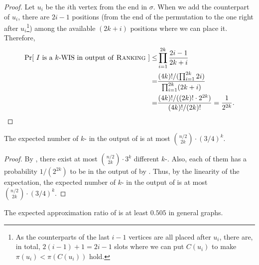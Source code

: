 \begin{proof}
Let $u_i$ be the $i$th vertex from the end in $\sigma$. When we add the counterpart of $u_i$, there are $2i - 1$ positions (from the end of the permutation to the one right after $u_i$\footnote{As the counterparts of the last $i-1$ vertices are all placed after $u_i$, there are, in total, $2(i-1)+1=2i-1$ slots where we can put $C(u_i)$ to make $\pi(u_i)<\pi(C(u_i))$ hold.}) among the available $(2k + i)$ positions where we can place it. Therefore, 
\begin{align*}
    \Pr[\text{ $I$ is a $k$-WIS in output of \textsc{Ranking}{} }] \leq& \prod_{i=1}^{2k} \frac{2i - 1}{2k+i}\\
     =& \frac{(4k)! / (\prod_{i=1}^{2k} 2i)}{\prod_{i=1}^{2k} (2k + i)}\\
     =& \frac{(4k)! / ((2k)! \cdot 2^{2k})}{(4k)!/(2k)!} = \frac{1}{2^{2k}}.
\end{align*}
\end{proof}




\begin{lemma}\label{lem:upperbound-kwis}
    The expected number of $k$-\wis{} in the output of \rnk{} is at most ${n/2 \choose 2k} \cdot (3/4)^k$.
\end{lemma}

\begin{proof}
    By , there exist at most ${n/2 \choose 2k} \cdot 3^k$ different $k$-\wis{}. Also, each of them has a probability $1/(2^{2k})$ to be in the output of \rnk{} by . Thus, by the linearity of the expectation, the expected number of $k$-\wis{} in the output of \rnk{} is at most ${n/2 \choose 2k} \cdot (3/4)^k$.
\end{proof}


\begin{theorem}\label{thm:final}
The expected approximation ratio of \rnk{} is at least $0.505$ in general graphs.
\end{theorem}

